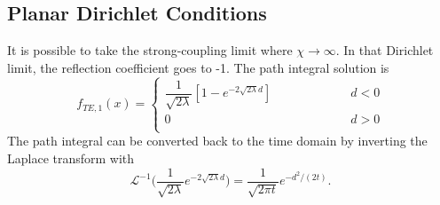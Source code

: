 

\subsection{Planar Dirichlet Conditions}

It is possible to take the strong-coupling limit where $\chi\rightarrow \infty$. 
In that Dirichlet limit, the reflection coefficient goes to -1.
The path integral solution is
\begin{equation}
  f_{TE,1}(x) = \left\{\begin{array}{lcr} 
      \dfrac{1}{\sqrt{2\lambda}}\left[1 - e^{-2\sqrt{2\lambda}d}\right]  & \hspace{2cm} & d<0\\
      0 & \hspace{2cm} & d>0\\
    \end{array} \right. 
\end{equation}
The path integral can be converted back to the time domain by inverting the Laplace transform with
\begin{equation}
  \mathcal{L}^{-1}\bigg(\frac{1}{\sqrt{2\lambda}}e^{-2\sqrt{2\lambda}d}\bigg) 
  = \frac{1}{\sqrt{2\pi t}}e^{-d^2/(2t)}.
\end{equation}

